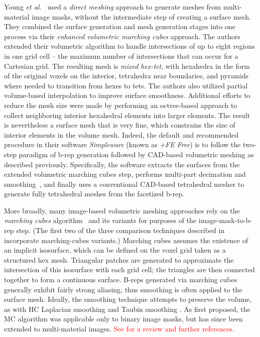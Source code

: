 Young \textit{et al.}~\cite{young_2008} used a \textit{direct meshing} approach to generate meshes from multi-material image masks, without the intermediate step of creating a surface mesh. They combined the surface generation and mesh generation stages into one process via their \textit{enhanced volumetric marching cubes} approach.  The authors extended their volumetric algorithm to handle intersections of up to eight regions in one grid cell -- the maximum number of intersections that can occur for a Cartesian grid.  The resulting mesh is \textit{mixed hex-tet}, with hexahedra in the form of the original voxels on the interior, tetrahedra near boundaries, and pyramids where needed to transition from hexes to tets. The authors also utilized partial volume-based interpolation to improve surface smoothness. Additional efforts to reduce the mesh size were made by performing an octree-based approach to collect neighboring interior hexahedral elements into larger elements.  The result is nevertheless a surface mesh that is very fine, which constrains the size of interior elements in the volume mesh.  Indeed, the default and recommended procedure in their software \textit{Simpleware} (known as \textit{+FE Free}) is to follow the two-step paradigm of b-rep generation followed by CAD-based volumetric meshing as described previously. Specifically, the software extracts the surfaces from the extended volumetric marching cubes step, performs multi-part decimation and smoothing~\cite{egst}, and finally uses a conventional CAD-based tetrahedral mesher to generate fully tetrahedral meshes from the facetized b-rep.

More broadly, many image-based volumetric meshing approaches rely on the \textit{marching cubes} algorithm~\cite{lorensen_1987} and its variants for purposes of the image-mask-to-b-rep step.  (The first two of the three comparison techniques described in  incorporate marching-cubes variants.)  Marching cubes assumes the existence of an implicit isosurface, which can be defined on the voxel grid taken as a structured hex mesh.  Triangular patches are generated to approximate the intersection of this isosurface with each grid cell; the triangles are then connected together to form a continuous surface. B-reps generated via marching cubes generally exhibit fairly strong aliasing, thus smoothing is often applied to the surface mesh.  Ideally, the smoothing technique attempts to preserve the volume, as with HC Laplacian smoothing\cite{vollmer_1999} and Taubin smoothing \cite{taubin1995signal, taubin_1995}.  As first proposed, the MC algorithm was applicable only to binary image masks, but has since been extended to multi-material images.  \textcolor{red}{See \cite{} for a review and further references.}

